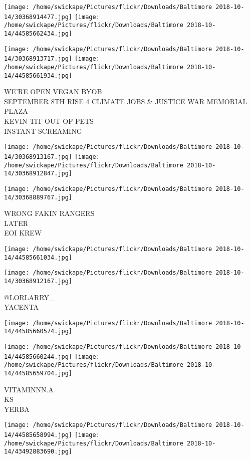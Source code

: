 \documentclass[10pt,letterpaper]{article}
\begin{document}
\texttt{[image: /home/swickape/Pictures/flickr/Downloads/Baltimore 2018-10-14/30368914477.jpg]}
\texttt{[image: /home/swickape/Pictures/flickr/Downloads/Baltimore 2018-10-14/44585662434.jpg]}

\texttt{[image: /home/swickape/Pictures/flickr/Downloads/Baltimore 2018-10-14/30368913717.jpg]}
\texttt{[image: /home/swickape/Pictures/flickr/Downloads/Baltimore 2018-10-14/44585661934.jpg]}

WE'RE OPEN VEGAN BYOB\\
SEPTEMBER 8TH RISE 4 CLIMATE JOBS \& JUSTICE WAR MEMORIAL PLAZA\\
KEVIN TIT OUT OF PETS\\
INSTANT SCREAMING
\pagebreak

\texttt{[image: /home/swickape/Pictures/flickr/Downloads/Baltimore 2018-10-14/30368913167.jpg]}
\texttt{[image: /home/swickape/Pictures/flickr/Downloads/Baltimore 2018-10-14/30368912847.jpg]}

\texttt{[image: /home/swickape/Pictures/flickr/Downloads/Baltimore 2018-10-14/30368889767.jpg]}

WRONG FAKIN RANGERS\\
LATER\\
EOI KREW
\pagebreak

\texttt{[image: /home/swickape/Pictures/flickr/Downloads/Baltimore 2018-10-14/44585661034.jpg]}

\vspace{0.25in}
\texttt{[image: /home/swickape/Pictures/flickr/Downloads/Baltimore 2018-10-14/30368912167.jpg]}

@LORLARRY\_\\
YACENTA
\pagebreak

\texttt{[image: /home/swickape/Pictures/flickr/Downloads/Baltimore 2018-10-14/44585660574.jpg]}

\vspace{0.25in}
\texttt{[image: /home/swickape/Pictures/flickr/Downloads/Baltimore 2018-10-14/44585660244.jpg]}
\texttt{[image: /home/swickape/Pictures/flickr/Downloads/Baltimore 2018-10-14/44585659704.jpg]}

VITAMINNN.A\\
KS\\
YERBA
\pagebreak

\texttt{[image: /home/swickape/Pictures/flickr/Downloads/Baltimore 2018-10-14/44585658994.jpg]}
\texttt{[image: /home/swickape/Pictures/flickr/Downloads/Baltimore 2018-10-14/43492883690.jpg]}
\end{document}
